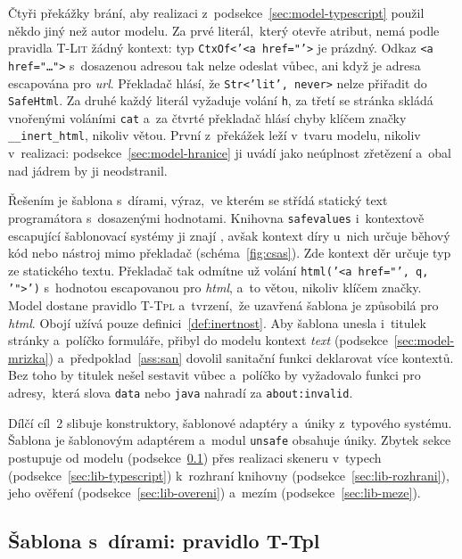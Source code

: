 Čtyři překážky brání, aby realizaci z~podsekce~\ref{sec:model-typescript} použil někdo jiný než autor modelu. Za prvé literál,~který otevře atribut, nemá podle pravidla \textsc{T-Lit} žádný kontext: typ \texttt{CtxOf<'<a href="'>} je prázdný. Odkaz \verb|<a href="…">| s~dosazenou adresou tak nelze odeslat vůbec, ani když je adresa escapována pro \emph{url}. Překladač hlásí, že \texttt{Str<'lit', never>} nelze přiřadit do \texttt{SafeHtml}. Za druhé každý literál vyžaduje volání \texttt{h}, za třetí se stránka skládá vnořenými voláními \texttt{cat} a~za čtvrté překladač hlásí chyby klíčem značky \texttt{\_\_inert\_html}, nikoliv větou. První z~překážek leží v~tvaru modelu, nikoliv v~realizaci: podsekce~\ref{sec:model-hranice} ji uvádí jako neúplnost zřetězení a~obal nad jádrem by ji neodstranil.

Řešením je šablona s~dírami, výraz,~ve kterém se střídá statický text programátora s~dosazenými hodnotami. Knihovna \texttt{safevalues} i~kontextově escapující šablonovací systémy ji znají \parencite{samuel2011context}, avšak kontext díry u~nich určuje běhový kód nebo nástroj mimo překladač (schéma~\ref{fig:csas}). Zde kontext děr určuje typ ze statického textu. Překladač tak odmítne už volání \texttt{html('<a href="', q, '">')} s~hodnotou escapovanou pro \emph{html}, a~to větou, nikoliv klíčem značky. Model dostane pravidlo \textsc{T-Tpl} a~tvrzení,~že uzavřená šablona je způsobilá pro \emph{html}. Obojí užívá pouze definici~\ref{def:inertnost}. Aby šablona unesla i~titulek stránky a~políčko formuláře, přibyl do modelu kontext \emph{text} (podsekce~\ref{sec:model-mrizka}) a~předpoklad~\ref{ass:san} dovolil sanitační funkci deklarovat více kontextů. Bez toho by titulek nešel sestavit vůbec a~políčko by vyžadovalo funkci pro adresy,~která slova \texttt{data} nebo \texttt{java} nahradí za \texttt{about:invalid}.

Dílčí cíl~2 slibuje konstruktory, šablonové adaptéry a~úniky z~typového systému. Šablona je šablonovým adaptérem a~modul \texttt{unsafe} obsahuje úniky. Zbytek sekce postupuje od modelu (podsekce~\ref{sec:lib-tpl}) přes realizaci skeneru v~typech (podsekce~\ref{sec:lib-typescript}) k~rozhraní knihovny (podsekce~\ref{sec:lib-rozhrani}), jeho ověření (podsekce~\ref{sec:lib-overeni}) a~mezím (podsekce~\ref{sec:lib-meze}).

\subsection{Šablona s~dírami: pravidlo T-Tpl}
\label{sec:lib-tpl}

